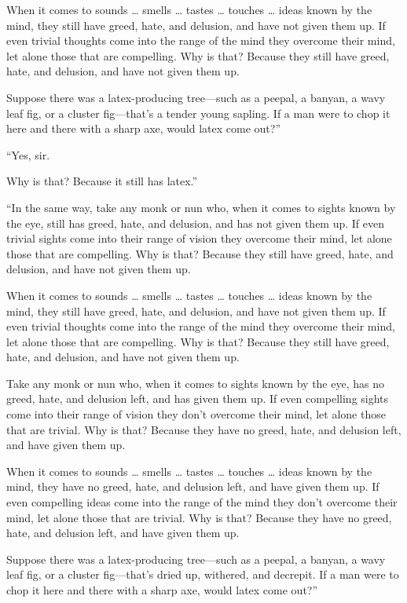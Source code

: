\documentclass[12pt,openany]{book}%
\begin{document}
When it comes to sounds … smells … tastes … touches … ideas known by the mind, they still have greed, hate, and delusion, and have not given them up. If even trivial thoughts come into the range of the mind they overcome their mind, let alone those that are compelling. Why is that? Because they still have greed, hate, and delusion, and have not given them up. 

Suppose there was a latex-producing tree—such as a peepal, a banyan, a wavy leaf fig, or a cluster fig—that’s a tender young sapling. If a man were to chop it here and there with a sharp axe, would latex come out?” 

“Yes, sir. 

Why is that? Because it still has latex.” 

“In the same way, take any monk or nun who, when it comes to sights known by the eye, still has greed, hate, and delusion, and has not given them up. If even trivial sights come into their range of vision they overcome their mind, let alone those that are compelling. Why is that? Because they still have greed, hate, and delusion, and have not given them up. 

When it comes to sounds … smells … tastes … touches … ideas known by the mind, they still have greed, hate, and delusion, and have not given them up. If even trivial thoughts come into the range of the mind they overcome their mind, let alone those that are compelling. Why is that? Because they still have greed, hate, and delusion, and have not given them up. 

Take any monk or nun who, when it comes to sights known by the eye, has no greed, hate, and delusion left, and has given them up. If even compelling sights come into their range of vision they don’t overcome their mind, let alone those that are trivial. Why is that? Because they have no greed, hate, and delusion left, and have given them up. 

When it comes to sounds … smells … tastes … touches … ideas known by the mind, they have no greed, hate, and delusion left, and have given them up. If even compelling ideas come into the range of the mind they don’t overcome their mind, let alone those that are trivial. Why is that? Because they have no greed, hate, and delusion left, and have given them up. 

Suppose there was a latex-producing tree—such as a peepal, a banyan, a wavy leaf fig, or a cluster fig—that’s dried up, withered, and decrepit. If a man were to chop it here and there with a sharp axe, would latex come out?” 
\end{document}
